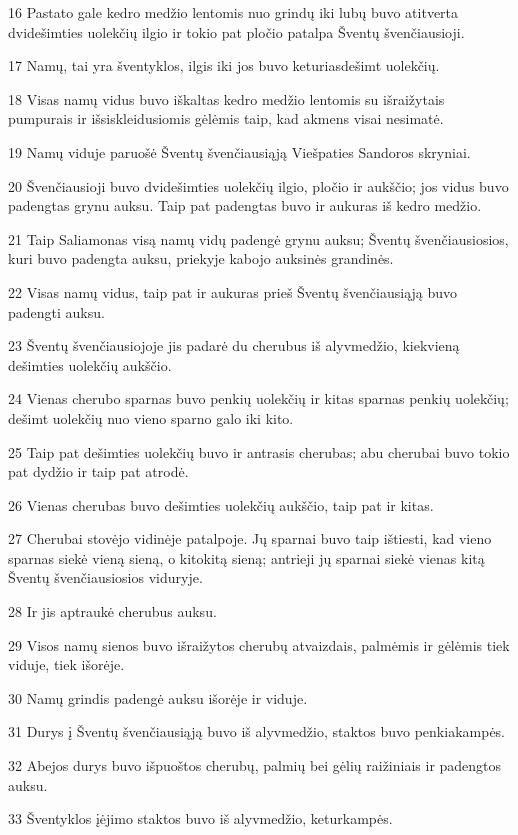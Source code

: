 \par 16 Pastato gale kedro medžio lentomis nuo grindų iki lubų buvo atitverta dvidešimties uolekčių ilgio ir tokio pat pločio patalpa­ Šventų švenčiausioji. 
\par 17 Namų, tai yra šventyklos, ilgis iki jos buvo keturiasdešimt uolekčių. 
\par 18 Visas namų vidus buvo iškaltas kedro medžio lentomis su išraižytais pumpurais ir išsiskleidusiomis gėlėmis taip, kad akmens visai nesimatė. 
\par 19 Namų viduje paruošė Šventų švenčiausiąją Viešpaties Sandoros skryniai. 
\par 20 Švenčiausioji buvo dvidešimties uolekčių ilgio, pločio ir aukščio; jos vidus buvo padengtas grynu auksu. Taip pat padengtas buvo ir aukuras iš kedro medžio. 
\par 21 Taip Saliamonas visą namų vidų padengė grynu auksu; Šventų švenčiausiosios, kuri buvo padengta auksu, priekyje kabojo auksinės grandinės. 
\par 22 Visas namų vidus, taip pat ir aukuras prieš Šventų švenčiausiąją buvo padengti auksu. 
\par 23 Šventų švenčiausiojoje jis padarė du cherubus iš alyvmedžio, kiekvieną dešimties uolekčių aukščio. 
\par 24 Vienas cherubo sparnas buvo penkių uolekčių ir kitas sparnas penkių uolekčių; dešimt uolekčių nuo vieno sparno galo iki kito. 
\par 25 Taip pat dešimties uolekčių buvo ir antrasis cherubas; abu cherubai buvo tokio pat dydžio ir taip pat atrodė. 
\par 26 Vienas cherubas buvo dešimties uolekčių aukščio, taip pat ir kitas. 
\par 27 Cherubai stovėjo vidinėje patalpoje. Jų sparnai buvo taip ištiesti, kad vieno sparnas siekė vieną sieną, o kito­kitą sieną; antrieji jų sparnai siekė vienas kitą Šventų švenčiausiosios viduryje. 
\par 28 Ir jis aptraukė cherubus auksu. 
\par 29 Visos namų sienos buvo išraižytos cherubų atvaizdais, palmėmis ir gėlėmis tiek viduje, tiek išorėje. 
\par 30 Namų grindis padengė auksu išorėje ir viduje. 
\par 31 Durys į Šventų švenčiausiąją buvo iš alyvmedžio, staktos buvo penkiakampės. 
\par 32 Abejos durys buvo išpuoštos cherubų, palmių bei gėlių raižiniais ir padengtos auksu. 
\par 33 Šventyklos įėjimo staktos buvo iš alyvmedžio, keturkampės. 
